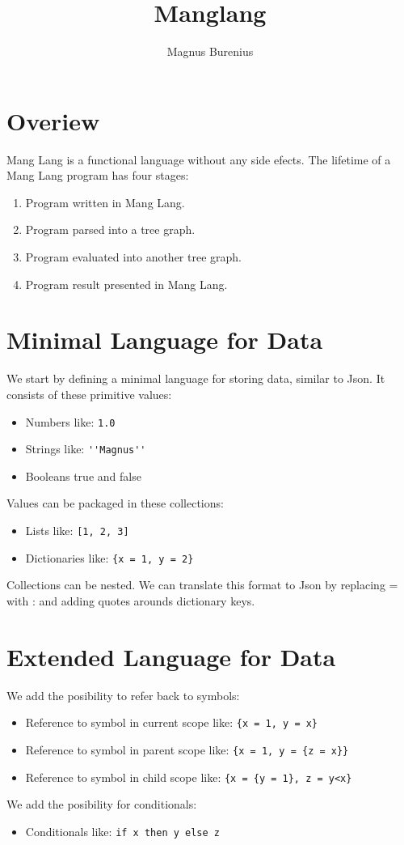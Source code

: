 \documentclass[a4paper,12pt]{article}
\title{Manglang}
\author{Magnus Burenius}
\begin{document}
\maketitle

\section{Overiew}

Mang Lang is a functional language without any side efects. The lifetime of a Mang Lang program has four stages:
\begin{enumerate}
\item Program written in Mang Lang.
\item Program parsed into a tree graph.
\item Program evaluated into another tree graph.
\item Program result presented in Mang Lang.
\end{enumerate}

\section{Minimal Language for Data}

We start by defining a minimal language for storing data, similar to Json. It consists of these primitive values:
\begin{itemize}
\item Numbers like: \lstinline|1.0|
\item Strings like: \lstinline|''Magnus''|
\item Booleans true and false
\end{itemize}
Values can be packaged in these collections:
\begin{itemize}
\item Lists like: \lstinline|[1, 2, 3]|
\item Dictionaries like: \lstinline|{x = 1, y = 2}|
\end{itemize}
Collections can be nested. We can translate this format to Json by replacing = with : and adding quotes arounds dictionary keys.

\section{Extended Language for Data}

We add the posibility to refer back to symbols:
\begin{itemize}
\item Reference to symbol in current scope like: \lstinline|{x = 1, y = x}|
\item Reference to symbol in parent scope like:  \lstinline|{x = 1, y = {z = x}}|
\item Reference to symbol in child scope like:  \lstinline|{x = {y = 1}, z = y<x}|
\end{itemize}
We add the posibility for conditionals:
\begin{itemize}
\item Conditionals like: \lstinline|if x then y else z|
\end{itemize}
\end{document}
